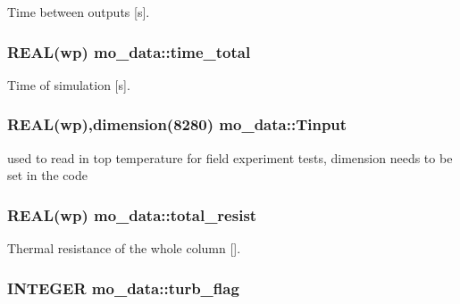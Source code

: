 Time between outputs \mbox{[}s\mbox{]}. 

\hypertarget{namespacemo__data_a6a4393d34e8f95d252b2bca2d30d5af3}{
\subsubsection[{time\_\-total}]{\setlength{\rightskip}{0pt plus 5cm}REAL(wp) {\bf mo\_\-data::time\_\-total}}}
\label{namespacemo__data_a6a4393d34e8f95d252b2bca2d30d5af3}


Time of simulation \mbox{[}s\mbox{]}. 

\hypertarget{namespacemo__data_a05dff3e3a302bd2f751263140d8f367b}{
\subsubsection[{Tinput}]{\setlength{\rightskip}{0pt plus 5cm}REAL(wp),dimension(8280) {\bf mo\_\-data::Tinput}}}
\label{namespacemo__data_a05dff3e3a302bd2f751263140d8f367b}


used to read in top temperature for field experiment tests, dimension needs to be set in the code 

\hypertarget{namespacemo__data_a71a192f5750717bc71df8f87c2a8cf52}{
\subsubsection[{total\_\-resist}]{\setlength{\rightskip}{0pt plus 5cm}REAL(wp) {\bf mo\_\-data::total\_\-resist}}}
\label{namespacemo__data_a71a192f5750717bc71df8f87c2a8cf52}


Thermal resistance of the whole column \mbox{[}\mbox{]}. 

\hypertarget{namespacemo__data_a7cc5384bbfd0b56d61cfe78576ee886d}{
\subsubsection[{turb\_\-flag}]{\setlength{\rightskip}{0pt plus 5cm}INTEGER {\bf mo\_\-data::turb\_\-flag}}}
\label{namespacemo__data_a7cc5384bbfd0b56d61cfe78576ee886d}


